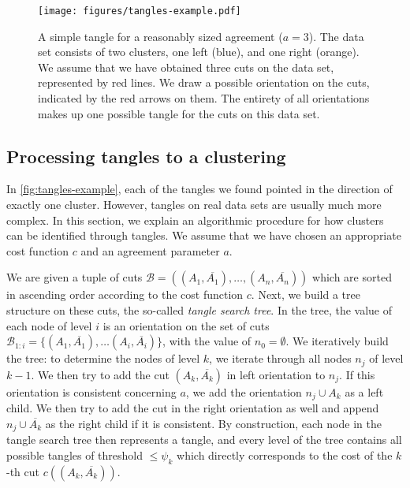 \begin{figure}[h]
    \centering
    \texttt{[image: figures/tangles-example.pdf]}
    \caption{A simple tangle for a reasonably sized agreement ($a = 3$). 
        The data set consists of two clusters, one left (blue), and one right (orange).
        We assume that we have obtained three cuts on the data set, represented 
        by red lines.
        We draw a possible orientation on the cuts, indicated by the red arrows on them. 
        The entirety of all orientations makes up one possible tangle for the cuts 
        on this data set. 
    }
    \label{fig:tangles-example}
\end{figure}

\subsection{Processing tangles to a clustering}
In \autoref{fig:tangles-example}, each of the tangles we found pointed in the direction 
of exactly one cluster. However, tangles on real data sets
are usually much more complex. In this section, we explain an algorithmic procedure for how clusters 
can be identified through tangles. We assume that we have chosen an appropriate
cost function $c$ and an agreement parameter $a$. 

We are given a tuple of cuts $\mathcal{B} = \left(  \left( A_1, \overline{A_1} \right) , \ldots, 
\left( A_n, \overline{A_n} \right)\right) $ which are sorted in  
ascending order according to the cost function $c$.  Next, we build a tree structure
on these cuts, the so-called \textit{tangle search tree}. 
In the tree, the value of each node of level $i$ is an orientation on the set of cuts $\mathcal{B}_{1:i} = \{(A_1, \overline{A_1}), \ldots (A_i, \overline{A_i})\}$, with the value of 
$n_0 = \emptyset$.
We iteratively build the tree: to determine the nodes of level $k$, we 
iterate through all nodes $n_j$ of level $k-1$. 
We then try to add the cut $(A_k, \overline{A_k})$ in left orientation to $n_j$. If this
orientation is consistent concerning $a$, we add the orientation $n_j \cup A_k$ as a left child. 
We then try to add the cut in the right orientation as well and append $n_j \cup \overline{A_k}$ as the right child if it is consistent.
By construction, each node in the tangle search tree then represents a tangle, and 
every level of the tree contains all possible tangles of threshold $\le \psi_k$ which directly corresponds to the cost of the $k$-th cut $c((A_k, \overline{A_k}))$. 

